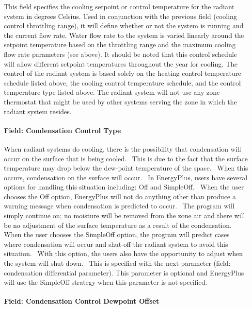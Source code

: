 This field specifies the cooling setpoint or control temperature for the radiant system in degrees Celsius. Used in conjunction with the previous field (cooling control throttling range), it will define whether or not the system is running and the current flow rate. Water flow rate to the system is varied linearly around the setpoint temperature based on the throttling range and the maximum cooling flow rate parameters (see above). It should be noted that this control schedule will allow different setpoint temperatures throughout the year for cooling. The control of the radiant system is based solely on the heating control temperature schedule listed above, the cooling control temperature schedule, and the control temperature type listed above. The radiant system will not use any zone thermostat that might be used by other systems serving the zone in which the radiant system resides.

\paragraph{Field: Condensation Control Type}\label{field-condensation-control-type}

When radiant systems do cooling, there is the possibility that condensation will occur on the surface that is being cooled.~ This is due to the fact that the surface temperature may drop below the dew-point temperature of the space.~ When this occurs, condensation on the surface will occur.~ In EnergyPlus, users have several options for handling this situation including: Off and SimpleOff.~ When the user chooses the Off option, EnergyPlus will not do anything other than produce a warning message when condensation is predicted to occur.~ The program will simply continue on; no moisture will be removed from the zone air and there will be no adjustment of the surface temperature as a result of the condensation.~ When the user chooses the SimpleOff option, the program will predict cases where condensation will occur and shut-off the radiant system to avoid this situation.~ With this option, the users also have the opportunity to adjust when the system will shut down.~ This is specified with the next parameter (field: condensation differential parameter). This parameter is optional and EnergyPlus will use the SimpleOff strategy when this parameter is not specified.

\paragraph{Field: Condensation Control Dewpoint Offset}\label{field-condensation-control-dewpoint-offset}

